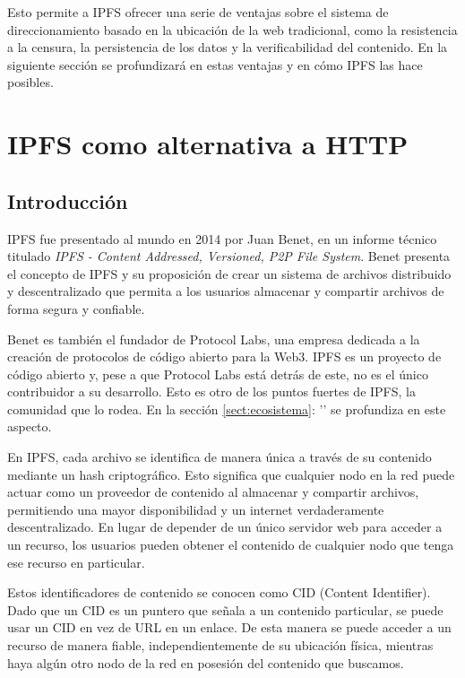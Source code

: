 Esto permite a IPFS ofrecer una serie de ventajas sobre el sistema de direccionamiento basado en la ubicación de la web
tradicional, como la resistencia a la censura, la persistencia de los datos y la verificabilidad del contenido.
En la siguiente sección se profundizará en estas ventajas y en cómo IPFS las hace posibles.

\section{IPFS como alternativa a HTTP}\label{sect:ipfs}

\subsection{Introducción}
IPFS fue presentado al mundo en 2014 por Juan Benet, en un informe técnico titulado
\textit{IPFS - Content Addressed, Versioned, P2P File System}\cite{benetIPFSContentAddressed2014}.
Benet presenta el concepto de IPFS y su proposición de crear un sistema de archivos
distribuido y descentralizado que permita a los usuarios almacenar y compartir archivos de forma segura y confiable.

Benet es también el fundador de Protocol Labs\cite{ProtocolLabs}, una empresa dedicada a la creación de protocolos de código abierto para la Web3.
IPFS es un proyecto de código abierto y, pese a que Protocol Labs está detrás de este, no es el único contribuidor a su desarrollo. Esto es otro
de los puntos fuertes de IPFS, la comunidad que lo rodea.   En la sección \ref{sect:ecosistema}: '' se profundiza en este aspecto.

En IPFS, cada archivo se identifica de manera única a través de su contenido mediante un hash criptográfico. Esto significa que
cualquier nodo en la red puede actuar como un proveedor de contenido al almacenar y compartir archivos, permitiendo una mayor
disponibilidad y un internet verdaderamente descentralizado. En lugar de depender de un único servidor web para acceder a un
recurso, los usuarios pueden obtener el contenido de cualquier nodo que tenga ese recurso en particular.

Estos identificadores de contenido se conocen como CID (Content Identifier). Dado que un CID es un puntero que señala a un contenido particular, se puede usar un CID en vez de URL en un enlace. De esta manera
se puede acceder a un recurso de manera fiable, independientemente de su ubicación física, mientras haya algún otro nodo de la red en posesión del
contenido que buscamos.

